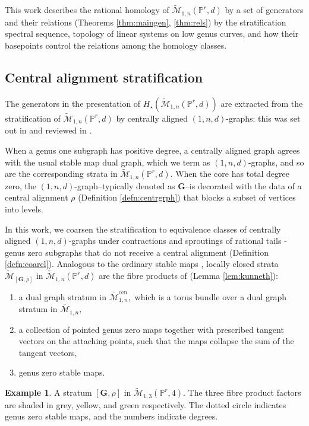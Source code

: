 \documentclass[12pt,reqno]{amsart}
\theoremstyle{definition}
\theoremstyle{definition}
\theoremstyle{definition}
\theoremstyle{definition}
\newtheorem{example}[theorem]{Example}
\newcommand{\ol}[1]{\overline{#1}}
\newcommand{\PP}{\mathbb{P}}
\newcommand{\Mcal}{\mathcal{M}}
\newcommand{\Mbar}{\ol{\Mcal}}
\newcommand{\Mtil}{\widetilde{\mathcal{M}}}
\begin{document}
This work describes the rational homology of $\Mtil_{1,n}(\PP^r,d)$ by a set of generators and their relations (Theorems \ref{thm:maingen}, \ref{thm:rels}) by the stratification spectral sequence, topology of linear systems on low genus curves, and how their basepoints control the relations among the homology classes.

\subsection{Central alignment stratification} The generators in the presentation of $H_\star(\Mtil_{1,n}(\PP^r,d))$ are extracted from the stratification of $\Mtil_{1,n}(\PP^r,d)$ by centrally aligned $(1,n,d)$-graphs: this was set out in \cite{rspw} and reviewed in \cite{vzdualcomplex}. 

When a genus one subgraph has positive degree, a centrally aligned graph agrees with the usual stable map dual graph, which we term as $(1,n,d)$-graphs, and so are the corresponding strata in $\Mtil_{1,n}(\PP^r,d)$. When the core has total degree zero, the $(1,n,d)$-graph--typically denoted as $\mathbf{G}$--is decorated with the data of a central alignment $\rho$ (Definition \ref{defn:centrgrph}) that blocks a subset of vertices into levels. 

In this work, we coarsen the stratification to equivalence classes of centrally aligned $(1,n,d)$-graphs under contractions and sproutings of rational tails - genus zero subgraphs that do not receive a central alignment (Definition \ref{defn:coarcl}). Analogous to the ordinary stable maps \cite[§3]{bm}, locally closed strata $\Mtil_{[\mathbf{G},\rho]}$ in $\Mtil_{1,n}(\PP^r,d)$ are the fibre products of (Lemma \ref{lem:kunneth}):
\begin{enumerate}
  \item a dual graph stratum in $\Mbar_{1,n}^{\mathrm{cen}},$ which is a torus bundle over a dual graph stratum in $\Mbar_{1,n},$
  \item a collection of pointed genus zero maps together with prescribed tangent vectors on the attaching points, such that the maps collapse the sum of the tangent vectors,
  \item genus zero stable maps.
\end{enumerate}
 

\begin{example}
  A stratum $[\mathbf{G},\rho]$ in $\Mtil_{1,3}(\PP^r,4).$ The three fibre product factors are shaded in grey, yellow, and green respectively. The dotted circle indicates genus zero stable maps, and the numbers indicate degrees.
\end{example}
\end{document}
